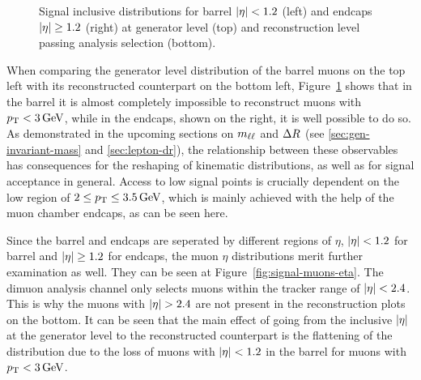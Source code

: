 \begin{figure}[!htb]
\caption[Signal \pt distributions split into barrel and endcaps]{ Signal inclusive \pt distributions for barrel $\abs{\eta} < 1.2$ (left) and endcaps $\abs{\eta} \geq 1.2$ (right) at generator level (top) and reconstruction level passing analysis selection (bottom).}
\label{fig:signal-pt-barrel-endcaps}
\end{figure}

When comparing the generator level distribution of the barrel muons on the top left with its reconstructed counterpart on the bottom left, Figure~\ref{fig:signal-pt-barrel-endcaps} shows that in the barrel it is almost completely impossible to reconstruct muons with $p_{\mathrm{T}} < 3\,\text{Ge\hspace{-.08em}V}$, while in the endcaps, shown on the right, it is well possible to do so. As demonstrated in the upcoming sections on $m_{\ell\ell}$ and $\Delta R$ (see \ref{sec:gen-invariant-mass} and \ref{sec:lepton-dr}), the relationship between these observables has consequences for the reshaping of kinematic distributions, as well as for signal acceptance in general. Access to low \dm signal points is crucially dependent on the low \pt region of $2 \leq p_{\mathrm{T}} \leq 3.5\,\text{Ge\hspace{-.08em}V}$, which is mainly achieved with the help of the muon chamber endcaps, as can be seen here.

Since the barrel and endcaps are seperated by different regions of $\eta$, $\abs{\eta} < 1.2$ for barrel and $\abs{\eta} \geq 1.2$ for endcaps, the muon $\eta$ distributions merit further examination as well. They can be seen at Figure~\ref{fig:signal-muons-eta}. The dimuon analysis channel only selects muons within the tracker range of $\abs{\eta}<2.4$. This is why the muons with $\abs{\eta}>2.4$ are not present in the reconstruction plots on the bottom. It can be seen that the main effect of going from the inclusive $\abs{\eta}$ at the generator level to the reconstructed counterpart is the flattening of the distribution due to the loss of muons with $\abs{\eta}<1.2$ in the barrel for muons with $p_{\mathrm{T}}<3\,\text{Ge\hspace{-.08em}V}$.

